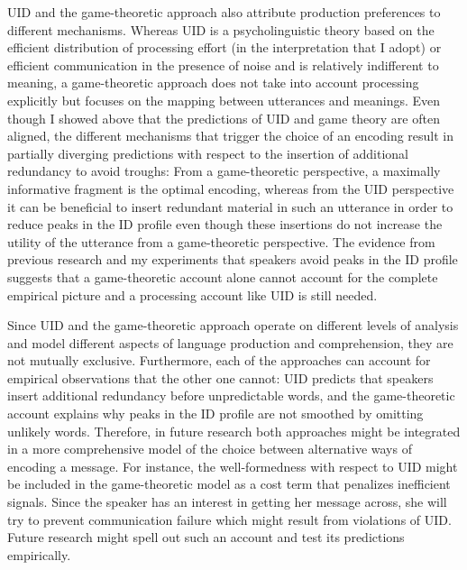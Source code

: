 \newpage
\noindent UID and the game-theoretic approach also attribute production preferences to different mechanisms. Whereas UID is a psycholinguistic theory based on the efficient distribution of processing effort (in the interpretation that I adopt) or efficient communication in the presence of noise and is relatively indifferent to meaning, a game-theoretic approach does not take into account processing explicitly but focuses on the mapping between utterances and meanings. Even though I showed above that the predictions of UID and game theory are often aligned, the different mechanisms that trigger the choice of an encoding result in partially diverging predictions with respect to the insertion of additional redundancy to avoid troughs: From a game-theoretic perspective, a maximally informative fragment is the optimal encoding, whereas from the UID perspective it can be beneficial to insert redundant material in such an utterance in order to reduce peaks in the ID profile even though these insertions do not increase the utility of the utterance from a game-theoretic perspective. The evidence from previous research and my experiments that speakers avoid peaks in the ID profile suggests that a game-theoretic account alone cannot account for the complete empirical picture and a processing account like UID is still needed.

Since UID and the game-theoretic approach operate on different levels of analysis and model different aspects of language production and comprehension, they are not mutually exclusive. Furthermore, each of the approaches can account for empirical observations that the other one cannot: UID predicts that speakers insert additional redundancy before unpredictable words, and the game-theoretic account explains why peaks in the ID profile are not smoothed by omitting unlikely words. Therefore, in future research both approaches might be integrated in a more comprehensive model of the choice between alternative ways of encoding a message. For instance, the well-formedness with respect to UID might be included in the game-theoretic model as a cost term that penalizes inefficient signals. Since the speaker has an interest in getting her message across, she will try to prevent communication failure which might result from violations of UID. Future research might spell out such an account and test its predictions empirically.